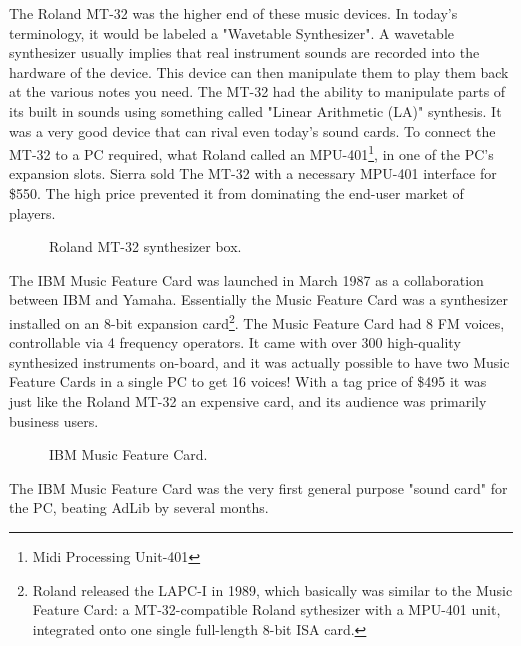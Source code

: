 \documentclass[book.tex]{subfiles}
\begin{document}
\par
The Roland MT-32 was the higher end of these music devices. In today's terminology, it would be labeled a "Wavetable Synthesizer". A wavetable synthesizer usually implies that real instrument sounds are recorded into the hardware of the device. This device can then manipulate them to play them back at the various notes you need. The MT-32 had the ability to manipulate parts of its built in sounds using something called "Linear Arithmetic (LA)" synthesis. It was a very good device that can rival even today's sound cards. To connect the MT-32 to a PC required, what Roland called an MPU-401\footnote{Midi Processing Unit-401}, in one of the PC's expansion slots. Sierra sold The MT-32 with a necessary MPU-401 interface for \$550. The high price prevented it from dominating the end-user market of players.\\

\par
  \begin{figure}[H] 
    \centering 
    \caption{Roland MT-32 synthesizer box.}
  \end{figure}


\par
The IBM Music Feature Card was launched in March 1987 as a collaboration between IBM and Yamaha. Essentially the Music Feature Card was a synthesizer installed on an 8-bit expansion card\footnote{Roland released the LAPC-I in 1989, which basically was similar to the Music Feature Card: a MT-32-compatible Roland sythesizer with a MPU-401 unit, integrated onto one single full-length 8-bit ISA card.}. The Music Feature Card had 8 FM voices, controllable via 4 frequency operators. It came with over 300 high-quality synthesized instruments on-board, and it was actually possible to have two Music Feature Cards in a single PC to get 16 voices! With a tag price of \$495 it was just like the Roland MT-32 an expensive card, and its audience was primarily business users.\\

\par
  \begin{figure}[H] 
    \centering 
    \caption{IBM Music Feature Card.}
  \end{figure}

\par
   The IBM Music Feature Card was the very first general purpose "sound card" for the PC, beating AdLib by several months. \\
\end{document}
